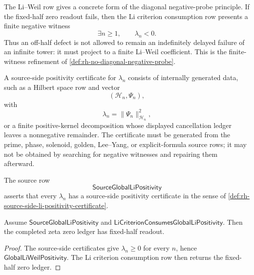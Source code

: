 \begin{principle}
\label{prin:rh-li-weil-reduction-finite-bad-witnesses}
The Li--Weil row gives a concrete form of the diagonal negative-probe
principle.  If the fixed-half zero readout fails, then the Li criterion
consumption row presents a finite negative witness
$$
\exists n\ge1,\qquad \lambda_n<0.
$$
Thus an off-half defect is not allowed to remain an indefinitely delayed
failure of an infinite tower: it must project to a finite Li--Weil
coefficient.  This is the finite-witness refinement of
\autoref{def:rh-no-diagonal-negative-probe}.
\end{principle}

\begin{definition}
\label{def:rh-source-side-li-positivity-certificate}
A source-side positivity certificate for $\lambda_n$ consists of
internally generated data, such as a Hilbert space row and vector
$$
(\mathcal H_n,\Psi_n),
$$
with
$$
\lambda_n=\|\Psi_n\|_{\mathcal H_n}^2,
$$
or a finite positive-kernel decomposition whose displayed cancellation
ledger leaves a nonnegative remainder.  The certificate must be
generated from the prime, phase, solenoid, golden, Lee--Yang, or
explicit-formula source rows; it may not be obtained by searching for
negative witnesses and repairing them afterward.
\end{definition}

\begin{definition}
\label{def:rh-source-global-li-positivity}
The source row
$$
\mathsf{SourceGlobalLiPositivity}
$$
asserts that every $\lambda_n$ has a source-side positivity certificate
in the sense of
\autoref{def:rh-source-side-li-positivity-certificate}.
\end{definition}

\begin{theorem}
\label{thm:rh-source-li-positivity-fixed-half-readout}
Assume $\mathsf{SourceGlobalLiPositivity}$ and
$\mathsf{LiCriterionConsumesGlobalLiPositivity}$.  Then the completed
zeta zero ledger has fixed-half readout.
\end{theorem}

\begin{proof}
The source-side certificates give $\lambda_n\ge0$ for every $n$, hence
$\mathsf{GlobalLiWeilPositivity}$.  The Li criterion consumption row
then returns the fixed-half zero ledger.
\end{proof}

